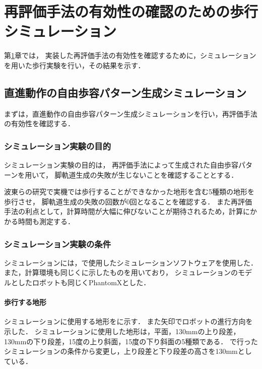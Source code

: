 ﻿

\chapter{再評価手法の有効性の確認のための歩行シミュレーション}\label{chapter:再評価手法の有効性の確認のための歩行シミュレーション}
第\ref{chapter:再評価手法の有効性の確認のための歩行シミュレーション}章では，
実装した再評価手法の有効性を確認するために，シミュレーションを用いた歩行実験を行い，その結果を示す．

\section{直進動作の自由歩容パターン生成シミュレーション}
まずは，直進動作の自由歩容パターン生成シミュレーションを行い，再評価手法の有効性を確認する．

\subsection{シミュレーション実験の目的}
シミュレーション実験の目的は，
再評価手法によって生成された自由歩容パターンを用いて，
脚軌道生成の失敗が生じないことを確認することとする．

波東らの研究で実機では歩行することができなかった地形を含む5種類の地形を歩行させ，
脚軌道生成の失敗の回数が0回となることを確認する．
また再評価手法の利点として，計算時間が大幅に伸びないことが期待されるため，計算にかかる時間も測定する．

\subsection{シミュレーション実験の条件}
シミュレーションには，で使用したシミュレーションソフトウェアを使用した．
また，計算環境も同じくに示したものを用いており，
シミュレーションのモデルとしたロボットも同じくPhantomXとした．

\subsubsection{歩行する地形}
シミュレーションに使用する地形をに示す．
また矢印でロボットの進行方向を示した．
シミュレーションに使用した地形は，平面，130mmの上り段差，130mmの下り段差，15度の上り斜面，15度の下り斜面の5種類である．
で行ったシミュレーションの条件から変更し，上り段差と下り段差の高さを130mmとしている．

